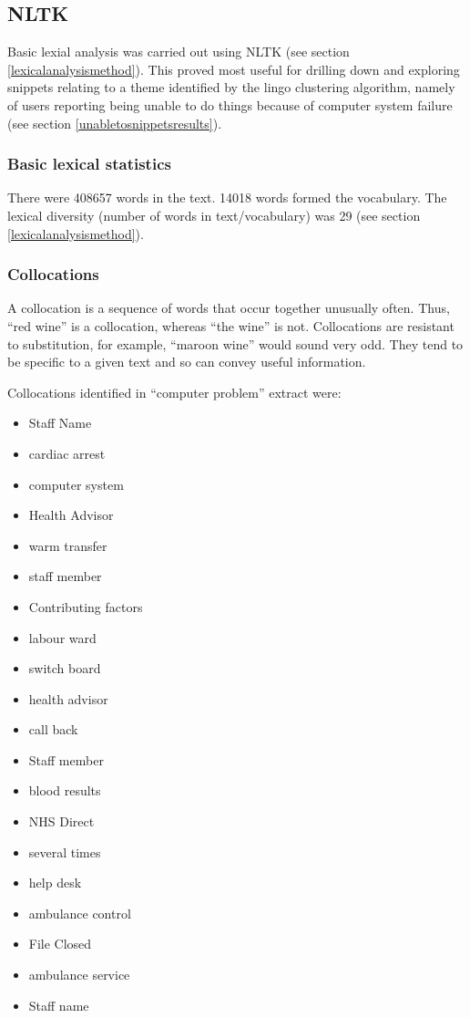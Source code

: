 \subsection{NLTK}
\label{lexicalanalysisresults}

Basic lexial analysis was carried out using NLTK (see section \ref{lexicalanalysismethod}). This proved most useful for drilling down and exploring snippets relating to a theme identified by the lingo clustering algorithm, namely of users reporting being unable to do things because of computer system failure (see section \ref{unabletosnippetsresults}).


\subsubsection{Basic lexical statistics}
There were 408657 words in the text. 14018 words formed the vocabulary. The lexical diversity (number of words in text/vocabulary) was 29 (see section \ref{lexicalanalysismethod}).


\subsubsection{Collocations}

A collocation is a sequence of words that occur together unusually often. Thus, ``red wine'' is a collocation, whereas ``the wine'' is not. Collocations are resistant to substitution, for example, ``maroon wine'' would sound very odd. They tend to be specific to a given text and so can convey useful information.\cite{Bird2009}

Collocations identified in ``computer problem'' extract were:

\begin{itemize}
 \item Staff Name
 \item cardiac arrest
 \item computer system
 \item Health Advisor
 \item warm transfer
 \item staff member
 \item Contributing factors
 \item labour ward
 \item switch board
 \item health advisor
 \item call back
 \item Staff member
 \item blood results
 \item NHS Direct
 \item several times
 \item help desk
 \item ambulance control
 \item File Closed
 \item ambulance service
 \item Staff name
\end{itemize}

